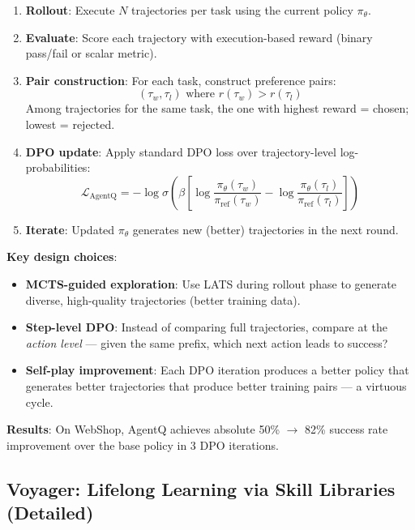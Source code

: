 \begin{enumerate}
  \item \textbf{Rollout}: Execute $N$ trajectories per task using the current policy $\pi_\theta$.
  \item \textbf{Evaluate}: Score each trajectory with execution-based reward (binary pass/fail or scalar metric).
  \item \textbf{Pair construction}: For each task, construct preference pairs: 
\begin{equation}
(\tau_w, \tau_l) \text{ where } r(\tau_w) > r(\tau_l)
\end{equation}
 Among trajectories for the same task, the one with highest reward = chosen; lowest = rejected.
  \item \textbf{DPO update}: Apply standard DPO loss over trajectory-level log-probabilities: 
\begin{equation}
\mathcal{L}_{\text{AgentQ}} = -\log \sigma\!\left(\beta \left[\log\frac{\pi_\theta(\tau_w)}{\pi_{\text{ref}}(\tau_w)} - \log\frac{\pi_\theta(\tau_l)}{\pi_{\text{ref}}(\tau_l)}\right]\right)
\end{equation}
  \item \textbf{Iterate}: Updated $\pi_\theta$ generates new (better) trajectories in the next round.
\end{enumerate}

\textbf{Key design choices}:

\begin{itemize}
  \item \textbf{MCTS-guided exploration}: Use LATS during rollout phase to generate diverse, high-quality trajectories (better training data).
  \item \textbf{Step-level DPO}: Instead of comparing full trajectories, compare at the \emph{action level} --- given the same prefix, which next action leads to success?
  \item \textbf{Self-play improvement}: Each DPO iteration produces a better policy that generates better trajectories that produce better training pairs --- a virtuous cycle.
\end{itemize}

\textbf{Results}: On WebShop, AgentQ achieves absolute 50\% $\rightarrow$ 82\% success rate improvement over the base policy in 3 DPO iterations.

\subsection{Voyager: Lifelong Learning via Skill Libraries (Detailed)}
\label{voyager-lifelong-learning-via-skill-libraries-detailed}

